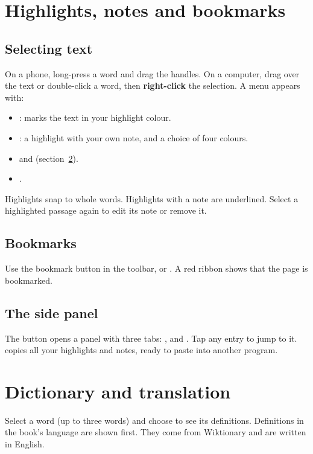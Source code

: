 \documentclass[11pt]{article}
\begin{document}
\section{Highlights, notes and bookmarks}

\subsection{Selecting text}
On a phone, long-press a word and drag the handles. On a computer, drag over the text or
double-click a word, then \textbf{right-click} the selection. A menu appears with:
\begin{itemize}
  \item {}: marks the text in your highlight colour.
  \item {}: a highlight with your own note, and a choice of four colours.
  \item {} and  (section~\ref{sec:lookup}).
  \item {}.
\end{itemize}
Highlights snap to whole words. Highlights with a note are underlined. Select a highlighted
passage again to edit its note or remove it.

\subsection{Bookmarks}
Use the bookmark button in the toolbar, or . A red ribbon shows that the page is
bookmarked.

\subsection{The side panel}
The  button opens a panel with three tabs: ,  and
. Tap any entry to jump to it.  copies all your highlights and
notes, ready to paste into another program.

\section{Dictionary and translation}\label{sec:lookup}

Select a word (up to three words) and choose  to see its definitions. Definitions in
the book's language are shown first. They come from Wiktionary and are written in English.
\end{document}
